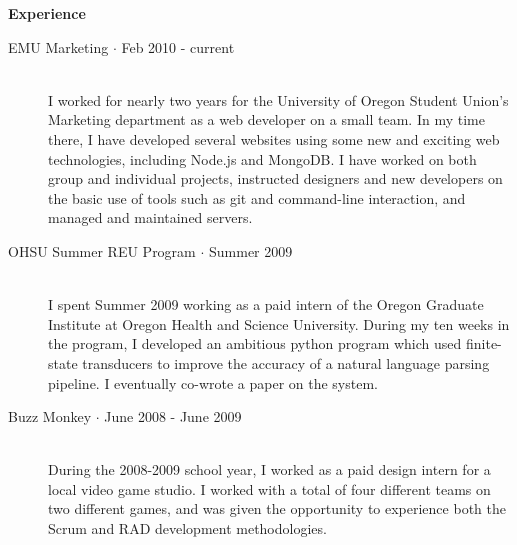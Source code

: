 \documentclass[10pt,letterpaper]{article}
\newenvironment{topic}[1]{
\begin{minipage}[t]{0.12\linewidth}\begin{flushleft}\begin{flushright}\textbf{#1}\end{flushright}\end{flushleft}\end{minipage}\hspace{4mm}\vrule\hspace{4mm}\begin{minipage}[t]{0.82\linewidth}\begin{flushright}\begin{flushleft}
}{
\end{flushleft}\end{flushright}\end{minipage}\vspace{12mm}
}
\begin{document}
\begin{topic}{Experience}
  \begin{description}
    \item[EMU Marketing $\cdot$ Feb 2010 - current]\hfill \\
    I worked for nearly two years for the University of Oregon Student Union's
    Marketing department as a web developer on a small team. In my time
    there, I have developed several websites using some new and exciting
    web technologies, including Node.js and MongoDB. I have worked on
    both group and individual projects, instructed designers and new
    developers on the basic use of tools such as git and command-line
    interaction, and managed and maintained servers.

    \item[OHSU Summer REU Program $\cdot$ Summer 2009]\hfill \\
    I spent Summer 2009 working as a paid intern of the Oregon Graduate
    Institute at Oregon Health and Science University. During my ten
    weeks in the program, I developed an ambitious python program which
    used finite-state transducers to improve the accuracy of a natural
    language parsing pipeline.
    I eventually co-wrote a paper on the system.

    \item[Buzz Monkey $\cdot$ June 2008 - June 2009] \hfill \\
    During the 2008-2009 school year, I worked as a paid design intern
    for a local video game studio.
    I worked with a total of four different teams on two different
    games, and was given the opportunity to experience both the Scrum
    and RAD development methodologies.
  \end{description}
\end{topic}
\end{document}
